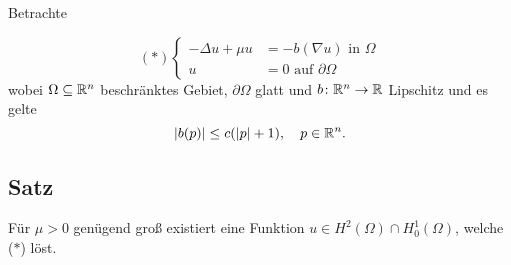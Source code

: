 Betrachte

$$
(\ast)
\begin{cases}
  -\Delta u + \mu u &= -b(\nabla u) \text{ in } \Omega \\
  u &= 0 \text{ auf } \partial \Omega
\end{cases}
$$
wobei $\Omega \subseteq \mathbb{R}^n$ beschränktes Gebiet, $\partial \Omega$ glatt und $b \colon \mathbb{R}^n \to \mathbb{R}$ Lipschitz und es gelte
$$
|b(p)| \leq c(|p| + 1), \quad p \in \mathbb{R}^n.
$$

\subsection{Satz}

Für $\mu > 0$  genügend groß existiert eine Funktion $u \in H^2(\Omega) \cap H_0^1(\Omega)$, welche ($\ast$) löst.

